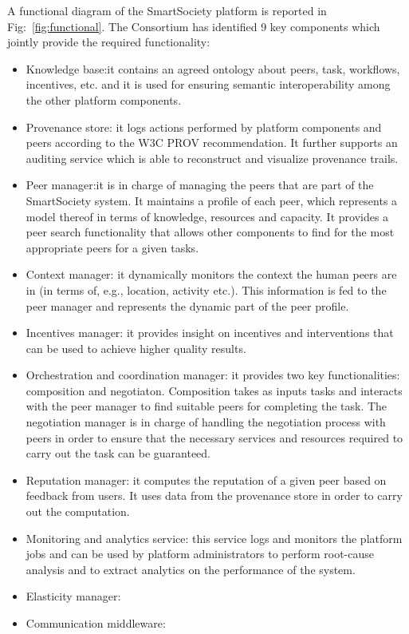 A functional diagram of the SmartSociety platform is reported in
Fig:~\ref{fig:functional}. The Consortium has identified 9 key
components which jointly provide the required functionality:
\begin{itemize}
\item Knowledge base:it contains an agreed ontology about peers, task,
workflows, incentives, etc. and it is used for ensuring semantic
interoperability among the other platform components. 
\item Provenance store: it logs actions performed by platform
components and peers according to the W3C PROV recommendation. It
further supports an auditing service which is able to reconstruct and
visualize provenance trails. 
\item Peer manager:it is in charge of managing the peers that are part
of the SmartSociety system. It maintains a profile of each peer, which
represents a model thereof in terms of knowledge, resources and
capacity. It provides a peer search functionality that allows other
components to find for the most appropriate peers for a given tasks. 
\item Context manager: it dynamically monitors the context the human
peers are in (in terms of, e.g., location, activity etc.). This
information is fed to the peer manager and represents the dynamic part
of the peer profile. 
\item Incentives manager: it provides insight on incentives and
interventions that can be used to achieve higher quality results. 
\item Orchestration and coordination manager: it provides two key
functionalities: composition and negotiaton. Composition takes as
inputs tasks and interacts with the peer manager to find suitable
peers for completing the task. The negotiation manager is in charge of
handling the negotiation process with peers in order to ensure that
the necessary services and resources required to carry out the task
can be guaranteed. 
\item Reputation manager: it computes the
reputation of a given peer based on feedback from users. It uses data
from the provenance store in order to carry out the computation.
\item Monitoring and analytics service: this service logs and monitors
the platform jobs and can be used by platform administrators to
perform root-cause analysis and to extract analytics on the
performance of the system. 
\item Elasticity manager:
\item Communication middleware: 
\end{itemize}       
